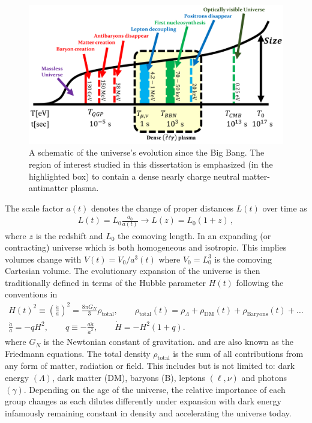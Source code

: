 \begin{figure}[ht]
 \centering
 \includegraphics[width=0.95\linewidth]{plots/chap01intro/thesis_universe.png}
 \caption{A schematic of the universe's evolution since the Big Bang. The region of interest studied in this dissertation is emphasized (in the highlighted box) to contain a dense nearly charge neutral matter-antimatter plasma.}
 \label{fig:cosmo} 
\end{figure}

The scale factor $a(t)$ denotes the change of proper distances $L(t)$ over time as
\begin{gather}
    L(t)=L_{0}\frac{a_{0}}{a(t)}\rightarrow L(z)=L_{0}(1+z)\,,
\end{gather}
where $z$ is the redshift and $L_{0}$ the comoving length. In an expanding (or contracting) universe which is both homogeneous and isotropic. This implies volumes change with $V(t)=V_{0}/a^{3}(t)$ where $V_{0}=L_{0}^{3}$ is the comoving Cartesian volume. The evolutionary expansion of the universe is then traditionally defined in terms of the Hubble parameter $H(t)$ following the conventions in~\cite{weinberg1972gravitation}
\begin{gather}
  \label{Friedmann:1} H(t)^{2}\equiv\left(\frac{\dot a}{a}\right)^2=\frac{8\pi G_{N}}{3}\rho_\mathrm{total},\qquad \rho_\mathrm{total}(t)=\rho_{\Lambda}+\rho_\mathrm{DM}(t)+\rho_\mathrm{Baryons}(t)+\ldots\\
  \label{Friedmann:2}
  \frac{\ddot a}{a}=-qH^2,\qquad 
q\equiv -\frac{a\ddot a}{\dot a^2},\qquad \dot H=-H^2(1+q).
\end{gather}
where $G_N$ is the Newtonian constant of gravitation.  and  are also known as the Friedmann equations. The total density $\rho_\mathrm{total}$ is the sum of all contributions from any form of matter, radiation or field. This includes but is not limited to: dark energy $(\Lambda)$, dark matter (DM), baryons (B), leptons $(\ell,\nu)$ and photons $(\gamma)$. Depending on the age of the universe, the relative importance of each group changes as each dilutes differently under expansion with dark energy infamously remaining constant in density and accelerating the universe today.

